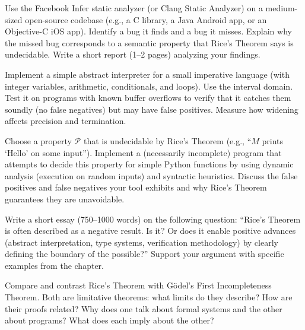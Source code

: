 \begin{exercise}[Computational]
Use the Facebook Infer static analyzer (or Clang Static Analyzer) on a medium-sized open-source codebase (e.g., a C library, a Java Android app, or an Objective-C iOS app). Identify a bug it finds and a bug it misses. Explain why the missed bug corresponds to a semantic property that Rice's Theorem says is undecidable. Write a short report (1--2 pages) analyzing your findings.
\end{exercise}

\begin{exercise}[Computational]
Implement a simple abstract interpreter for a small imperative language (with integer variables, arithmetic, conditionals, and loops). Use the interval domain. Test it on programs with known buffer overflows to verify that it catches them soundly (no false negatives) but may have false positives. Measure how widening affects precision and termination.
\end{exercise}

\begin{exercise}[Computational]
Choose a property $\mathcal{P}$ that is undecidable by Rice's Theorem (e.g., ``$M$ prints `Hello' on some input''). Implement a (necessarily incomplete) program that attempts to decide this property for simple Python functions by using dynamic analysis (execution on random inputs) and syntactic heuristics. Discuss the false positives and false negatives your tool exhibits and why Rice's Theorem guarantees they are unavoidable.
\end{exercise}

\begin{exercise}[Writing]
Write a short essay (750--1000 words) on the following question: ``Rice's Theorem is often described as a negative result. Is it? Or does it enable positive advances (abstract interpretation, type systems, verification methodology) by clearly defining the boundary of the possible?'' Support your argument with specific examples from the chapter.
\end{exercise}

\begin{exercise}[Writing]
Compare and contrast Rice's Theorem with G\"odel's First Incompleteness Theorem. Both are limitative theorems: what limits do they describe? How are their proofs related? Why does one talk about formal systems and the other about programs? What does each imply about the other?
\end{exercise}

